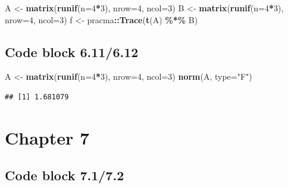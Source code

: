\documentclass[
]{book}
\newenvironment{Shaded}{\begin{snugshade}}{\end{snugshade}}
\newcommand{\DataTypeTok}[1]{\textcolor[rgb]{0.13,0.29,0.53}{#1}}
\newcommand{\DecValTok}[1]{\textcolor[rgb]{0.00,0.00,0.81}{#1}}
\newcommand{\KeywordTok}[1]{\textcolor[rgb]{0.13,0.29,0.53}{\textbf{#1}}}
\newcommand{\NormalTok}[1]{#1}
\newcommand{\OperatorTok}[1]{\textcolor[rgb]{0.81,0.36,0.00}{\textbf{#1}}}
\newcommand{\StringTok}[1]{\textcolor[rgb]{0.31,0.60,0.02}{#1}}
\begin{document}
\begin{Shaded}
\begin{Highlighting}[]
\NormalTok{A \textless{}{-}}\StringTok{ }\KeywordTok{matrix}\NormalTok{(}\KeywordTok{runif}\NormalTok{(}\DataTypeTok{n=}\DecValTok{4}\OperatorTok{*}\DecValTok{3}\NormalTok{), }\DataTypeTok{nrow=}\DecValTok{4}\NormalTok{, }\DataTypeTok{ncol=}\DecValTok{3}\NormalTok{)}
\NormalTok{B \textless{}{-}}\StringTok{ }\KeywordTok{matrix}\NormalTok{(}\KeywordTok{runif}\NormalTok{(}\DataTypeTok{n=}\DecValTok{4}\OperatorTok{*}\DecValTok{3}\NormalTok{), }\DataTypeTok{nrow=}\DecValTok{4}\NormalTok{, }\DataTypeTok{ncol=}\DecValTok{3}\NormalTok{)}
\NormalTok{f \textless{}{-}}\StringTok{ }\NormalTok{pracma}\OperatorTok{::}\KeywordTok{Trace}\NormalTok{(}\KeywordTok{t}\NormalTok{(A) }\OperatorTok{\%*\%}\StringTok{ }\NormalTok{B)}
\end{Highlighting}
\end{Shaded}

\hypertarget{code-block-6.116.12}{%
\subsection*{Code block 6.11/6.12}\label{code-block-6.116.12}}

\begin{Shaded}
\begin{Highlighting}[]
\NormalTok{A \textless{}{-}}\StringTok{ }\KeywordTok{matrix}\NormalTok{(}\KeywordTok{runif}\NormalTok{(}\DataTypeTok{n=}\DecValTok{4}\OperatorTok{*}\DecValTok{3}\NormalTok{), }\DataTypeTok{nrow=}\DecValTok{4}\NormalTok{, }\DataTypeTok{ncol=}\DecValTok{3}\NormalTok{)}
\KeywordTok{norm}\NormalTok{(A, }\DataTypeTok{type=}\StringTok{"F"}\NormalTok{)}
\end{Highlighting}
\end{Shaded}

\begin{verbatim}
## [1] 1.681079
\end{verbatim}

\hypertarget{chapter-7}{%
\section*{Chapter 7}\label{chapter-7}}

\hypertarget{code-block-7.17.2}{%
\subsection*{Code block 7.1/7.2}\label{code-block-7.17.2}}
\end{document}
